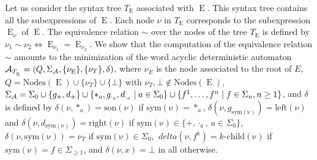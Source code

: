 \documentclass{llncs}
\DeclareMathOperator{\E}{E}
\begin{document}
Let us consider the syntax tree $T_{\E}$ associated with 
$\E$.
 This syntax tree contains all the subexpressions of $\E$. Each node $\nu$ in $T_{\E}$ corresponds to the 
subexpression $\E_{\nu}$ of $\E$. The equivalence relation $\sim$ over the nodes of the tree $T_{\E}$ is defined by $\nu_1 \sim\nu_2 \Leftrightarrow \E_{\nu_1}=\E_{\nu_2}$. We show that the computation of the equivalence relation $\sim$ amounts to the minimization of the word acyclic deterministic automaton ${\cal A}_{T_{_{\E}}} =(Q,\Sigma_{\cal A},\{\nu_{\E}\},\{\nu_T\},\delta)$, where $\nu_E$ is the node associated to the root of $E$, $Q=\mathrm{Nodes}(\E)\cup \{ \nu_T \}\cup\{\bot\}$ with $\nu_T,\bot\notin \mathrm{Nodes}(\E)$, $\Sigma_{\cal A}=\Sigma_0\cup\{g_+,d_+\}\cup\{*_a,g_{\cdot_a},d_{\cdot_a}\mid a\in \Sigma_0\}\cup\{f^1,\dots,f^n\mid f\in \Sigma_n, n\geq 1\}$, and $\delta$ is defined by $\delta(\nu,*_a)=\mathrm{son}(\nu)$ if $\mathrm{sym(\nu)}=*_a$, $\delta(\nu,g_{\mathrm{sym(\nu)}})=\mathrm{left}(\nu)$ and $\delta(\nu,d_{\mathrm{sym(\nu)}})=\mathrm{right}(\nu)$ if $\mathrm{sym(\nu)}\in \{+, \cdot_a,~a\in \Sigma_0\}$, $\delta(\nu,{\mathrm{sym(\nu)}})=\nu_T$ if $\mathrm{sym(\nu)}\in\Sigma_0$, $\
delta(\nu,f^k)=k\mbox{-}\mathrm{child(\nu)}$ if $\mathrm{sym(\nu)}=f\in\Sigma_{\geq 1}$, and $\delta(\nu,x)=\bot$ in all otherwise. 
\end{document}
